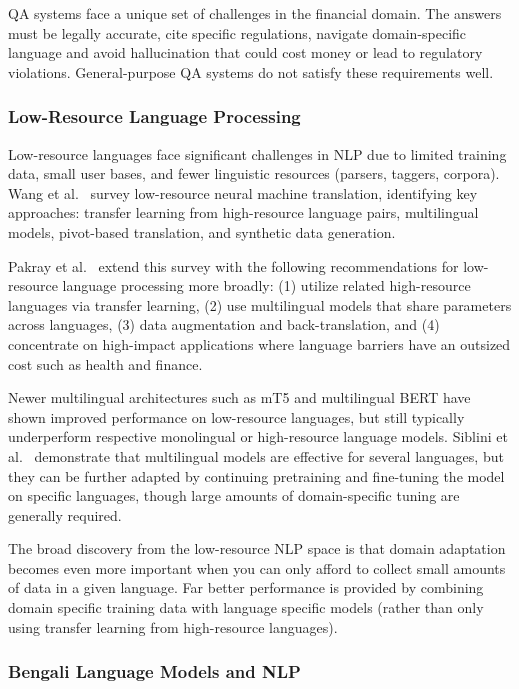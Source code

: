\documentclass{article}
\begin{document}
QA systems face a unique set of challenges in the financial domain. The answers must be
legally accurate, cite specific regulations, navigate domain-specific language and
avoid hallucination that could cost money or lead to regulatory violations.
General-purpose QA systems do not satisfy these requirements well.

\subsubsection{Low-Resource Language Processing}

Low-resource languages face significant challenges in NLP due to limited training data,
small user bases, and fewer linguistic resources (parsers, taggers, corpora). Wang et
al.~\cite{wang2021} survey low-resource neural machine translation, identifying key
approaches: transfer learning from high-resource language pairs, multilingual models,
pivot-based translation, and synthetic data generation.

Pakray et al.~\cite{Pakray2025} extend this survey with the following recommendations
for low-resource language processing more broadly: (1) utilize related high-resource
languages via transfer learning, (2) use multilingual models that share parameters
across languages, (3) data augmentation and back-translation, and (4) concentrate on
high-impact applications where language barriers have an outsized cost such as health
and finance.

Newer multilingual architectures such as mT5 \cite{Xue2021} and multilingual BERT
\cite{Devlin2018} have shown improved performance on low-resource languages, but still
typically underperform respective monolingual or high-resource language models. Siblini
et al.~\cite{siblini2019} demonstrate that multilingual models are effective for
several languages, but they can be further adapted by continuing pretraining and
fine-tuning the model on specific languages, though large amounts of domain-specific
tuning are generally required.

The broad discovery from the low-resource NLP space is that domain adaptation becomes
even more important when you can only afford to collect small amounts of data in a
given language. Far better performance is provided by combining domain specific
training data with language specific models (rather than only using transfer learning
from high-resource languages).

\subsubsection{Bengali Language Models and NLP}
\end{document}
